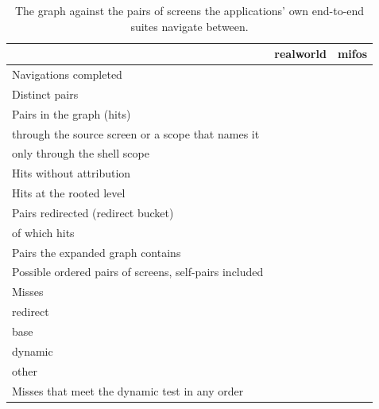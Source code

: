 \begin{table}[t]\footnotesize
\caption{The graph against the pairs of screens the applications' own end-to-end suites navigate between.}
\label{tab:e2e}
\begin{tabularx}{\textwidth}{@{}Yrr@{}}
\toprule
 & realworld & mifos \\
\midrule
Navigations completed & \EtoERealworldEnds{} & \EtoEMifosEnds{} \\
Distinct pairs & \EtoERealworldPairs{} & \EtoEMifosPairs{} \\
Pairs in the graph (hits) & \EtoERealworldHit{} & \EtoEMifosHit{} \\
\quad through the source screen or a scope that names it & \EtoERealworldHitScreen{} & \EtoEMifosHitScreen{} \\
\quad only through the shell scope & \EtoERealworldHitTop{} & \EtoEMifosHitTop{} \\
Hits without attribution & \EtoERealworldHitNoattr{} & \EtoEMifosHitNoattr{} \\
Hits at the rooted level & \EtoERealworldHitRooted{} & \EtoEMifosHitRooted{} \\
Pairs redirected (redirect bucket) & \EtoERealworldRedirect{} & \EtoEMifosRedirect{} \\
\quad of which hits & \EtoERealworldHitRedirect{} & \EtoEMifosHitRedirect{} \\
Pairs the expanded graph contains & \EtoERealworldGraphPairs{} & \EtoEMifosGraphPairs{} \\
Possible ordered pairs of screens, self-pairs included & \EtoERealworldPossiblePairs{} & \EtoEMifosPossiblePairs{} \\
Misses & \EtoERealworldMiss{} & \EtoEMifosMiss{} \\
\quad redirect & \EtoERealworldMissRedirect{} & \EtoEMifosMissRedirect{} \\
\quad base & \EtoERealworldMissBase{} & \EtoEMifosMissBase{} \\
\quad dynamic & \EtoERealworldMissDynamic{} & \EtoEMifosMissDynamic{} \\
\quad other & \EtoERealworldMissOther{} & \EtoEMifosMissOther{} \\
Misses that meet the dynamic test in any order & \EtoERealworldMissDynamicAny{} & \EtoEMifosMissDynamicAny{} \\
\bottomrule
\end{tabularx}
\par{}
\end{table}

